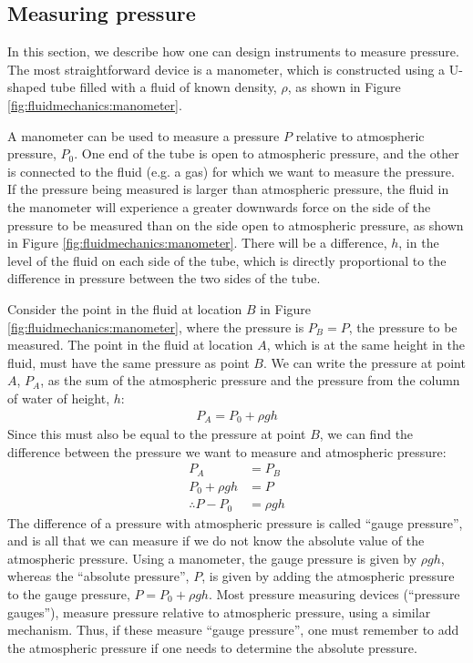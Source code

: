 \subsection{Measuring pressure}
In this section, we describe how one can design instruments to measure pressure. The most straightforward device is a manometer, which is constructed using a U-shaped tube filled with a fluid of known density, $\rho$, as shown in Figure \ref{fig:fluidmechanics:manometer}.
{
A manometer can be used to measure a pressure $P$ relative to atmospheric pressure, $P_0$. One end of the tube is open to atmospheric pressure, and the other is connected to the fluid (e.g. a gas) for which we want to measure the pressure. If the pressure being measured is larger than atmospheric pressure, the fluid in the manometer will experience a greater downwards force on the side of the pressure to be measured than on the side open to atmospheric pressure, as shown in Figure \ref{fig:fluidmechanics:manometer}. There will be a difference, $h$, in the level of the fluid on each side of the tube, which is directly proportional to the difference in pressure between the two sides of the tube.

Consider the point in the fluid at location $B$ in Figure \ref{fig:fluidmechanics:manometer}, where the pressure is $P_B=P$, the pressure to be measured. The point in the fluid at location $A$, which is at the same height in the fluid, must have the same pressure as point $B$. We can write the pressure at point $A$, $P_A$, as the sum of the atmospheric pressure and the pressure from the column of water of height, $h$:
\begin{align*}
P_A=P_0+\rho g h
\end{align*}
Since this must also be equal to the pressure at point $B$, we can find the difference between the pressure we want to measure and atmospheric pressure:
\begin{align*}
P_A &= P_B \\
P_0+\rho g h &= P\\
\therefore P - P_0 &= \rho g h 
\end{align*}
The difference of a pressure with atmospheric pressure is called ``gauge pressure'', and is all that we can measure if we do not know the absolute value of the atmospheric pressure. Using a manometer, the gauge pressure is given by $\rho g h$, whereas the ``absolute pressure'', $P$, is given by adding the atmospheric pressure to the gauge pressure, $P = P_0 + \rho g h$. Most pressure measuring devices (``pressure gauges''), measure pressure relative to atmospheric pressure, using a similar mechanism. Thus, if these measure ``gauge pressure'', one must remember to add the atmospheric pressure if one needs to determine the absolute pressure.

}
